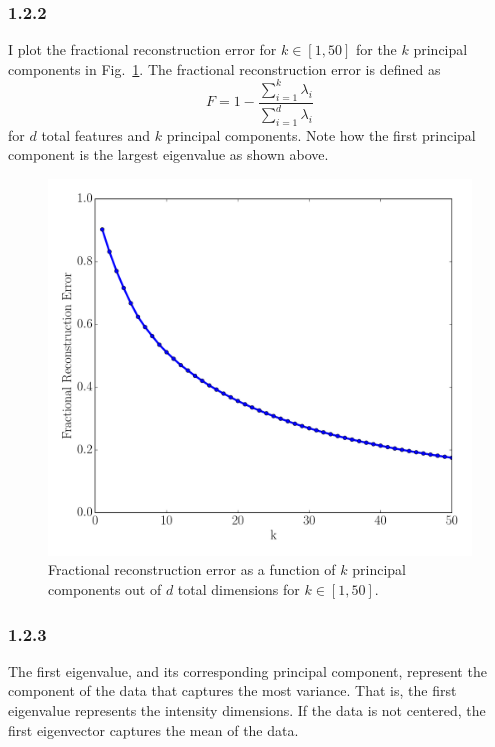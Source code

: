 \documentclass[12pt]{amsart}
\begin{document}
\subsubsection*{1.2.2}
I plot the fractional reconstruction error for $k \in [1,50]$ for the $k$ principal components in Fig.~\ref{fig:frac_rec_error}.  The fractional reconstruction error is defined as
\begin{equation} \label{eqn:frac_rec_error}
F = 1 - \frac{\sum_{i=1}^k \lambda_i}{\sum_{i=1}^d \lambda_i}
\end{equation}
for $d$ total features and $k$ principal components.  Note how the first principal component is the largest eigenvalue as shown above.
\begin{figure}[H]
	\includegraphics[width=\columnwidth]{fractional_rec_error.pdf}
    \caption{Fractional reconstruction error as a function of $k$ principal components out of $d$ total dimensions for $k \in [1,50]$.}
    \label{fig:frac_rec_error}
\end{figure}

\subsubsection*{1.2.3}
The first eigenvalue, and its corresponding principal component, represent the component of the data that captures the most variance.  That is, the first eigenvalue represents the intensity dimensions.  If the data is not centered, the first eigenvector captures the mean of the data.
\end{document}

